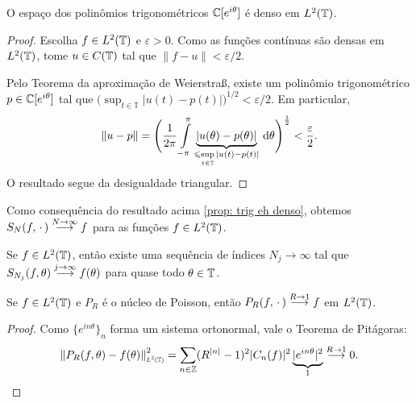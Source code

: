 \documentclass[../main.tex]{subfiles}
\begin{document}
\begin{proposicao}
    \label{prop: trig eh denso}
    O espaço dos polinômios trigonométricos $\operatorname{\mathbb{C}}[e^{i\theta}]$ é denso em $L^2(\mathbb T)$.

    \begin{proof}
        Escolha $f \in L^2(\mathbb T)$ e $\varepsilon > 0$. Como as funções contínuas são densas em $L^2(\mathbb T)$, tome $u \in C(\mathbb T)$ tal que $\|f - u\| < \varepsilon/2$. 

        Pelo Teorema da aproximação de Weierstra\ss, existe um polinômio trigonométrico $p\in \operatorname{\mathbb{C}}[e^{i\theta}]$ tal que $\big(\sup_{t\in \mathbb T}|u(t) - p(t)|\big)^{1/2} < \varepsilon/2$. Em particular,
        \begin{equation*}
            \|u - p\| = \Bigg({\dfrac1{2\pi} \int\limits_{-\pi}^\pi \underbrace{|u(\theta) - p(\theta)|}_{\leqslant \sup\limits_{t\in \mathbb T}|u(t) - p(t)|} \,{\operatorname{d}}{\theta}\Bigg)^{\frac12}} < \dfrac\varepsilon2.
        \end{equation*}
        O resultado segue da desigualdade triangular.
    \end{proof}
\end{proposicao}

Como consequência do resultado acima \ref{prop: trig eh denso}, obtemos $S_N(f, \operatorname{\,\cdot\,}) \overset{N\to\infty}{\longrightarrow} f$ para as funções $f\in L^2(\mathbb T)$.


\begin{corolario}
    Se $f\in L^2(\mathbb T)$, então existe uma sequência de índices $N_j \to \infty$ tal que $S_{N_j}(f, \theta) \overset{j\to \infty}{\longrightarrow} f(\theta)$ para quase todo $\theta \in \mathbb T$.
\end{corolario}

\begin{corolario}
    Se $f\in L^2(\mathbb T)$ e $P_R$ é o núcleo de Poisson, então $P_R(f, \operatorname{\,\cdot\,}) \overset{R\to1}{\longrightarrow} f$ em $L^2(\mathbb T)$.
    \begin{proof}
        Como $\{e^{in\theta}\}_n$ forma um sistema ortonormal, vale o Teorema de Pitágoras:
        \begin{equation*}
            \sub{\left\|P_R(f,\theta) - f(\theta)\right\|}{L^2(\UnitalCircle)}^2 = \sum_{n\in \Z} (R^{|n|} - 1)^2|C_n(f)|^2 \underbrace{|e^{in\theta}|^2}_1 \overset{R\to 1}\longto 0.
        \end{equation*}
    \end{proof}
\end{corolario}
\end{document}
